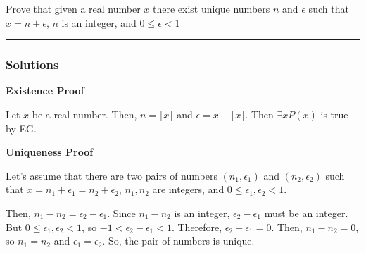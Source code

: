 \newpage
\begin{question}
Prove that given a real number $x$ there exist unique numbers
$n$ and $\epsilon$ such that $x=n+\epsilon$, $n$ is an integer, and
$0 \le \epsilon < 1$
\end{question}

\par\noindent\rule{\textwidth}{0.5pt}

\subsubsection*{Solutions}

\textbf{Existence Proof}

Let $x$ be a real number. Then, $n = \lfloor x \rfloor$ and $\epsilon = x - \lfloor x \rfloor$. Then $\exists x P(x)$ is true by EG.

\bigskip

\noindent\textbf{Uniqueness Proof}

Let's assume that there are two pairs of numbers $(n_1, \epsilon_1)$ and $(n_2, \epsilon_2)$ such that $x = n_1 + \epsilon_1 = n_2 + \epsilon_2$, $n_1, n_2$ are integers, and $0 \le \epsilon_1, \epsilon_2 < 1$.

Then, $n_1 - n_2 = \epsilon_2 - \epsilon_1$. Since $n_1 - n_2$ is an integer, $\epsilon_2 - \epsilon_1$ must be an integer. But $0 \le \epsilon_1, \epsilon_2 < 1$, so $-1 < \epsilon_2 - \epsilon_1 < 1$. Therefore, $\epsilon_2 - \epsilon_1 = 0$. Then, $n_1 - n_2 = 0$, so $n_1 = n_2$ and $\epsilon_1 = \epsilon_2$. So, the pair of numbers is unique.

